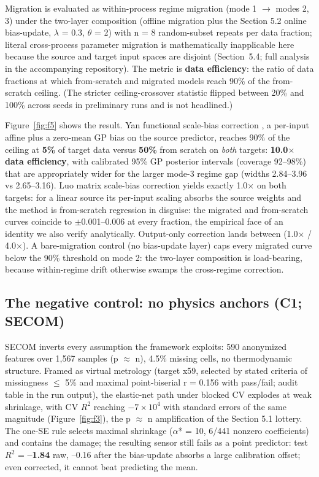 Migration is evaluated as within-process regime migration (mode 1 $\to$ modes 2, 3) under
the two-layer composition (offline migration plus the Section 5.2 online bias-update,
$\lambda$ = 0.3, $\theta$ = 2) with n = 8 random-subset repeats per data fraction; literal
cross-process parameter migration is mathematically inapplicable here because the
source and target input spaces are disjoint (Section~5.4; full analysis in the accompanying repository). The metric is \textbf{data
efficiency}: the ratio of data fractions at which from-scratch and migrated models
reach 90\% of the from-scratch ceiling. (The stricter ceiling-crossover statistic
flipped between 20\% and 100\% across seeds in preliminary runs and is not headlined.)

Figure~\ref{fig:f5} shows the result. Yan functional scale-bias correction \citep{yan2011}, a per-input affine plus a
zero-mean GP bias on the source predictor, reaches 90\% of the ceiling at \textbf{5\%} of
target data versus \textbf{50\%} from scratch on \emph{both} targets: \textbf{10.0$\times$ data efficiency},
with calibrated 95\% GP posterior intervals (coverage 92--98\%) that are appropriately
wider for the larger mode-3 regime gap (widths 2.84--3.96 vs 2.65--3.16). Luo matrix
scale-bias correction \citep{luo2015} yields exactly 1.0$\times$ on both targets: for a linear
source its per-input scaling absorbs the source weights and the method is from-scratch
regression in disguise: the migrated and from-scratch curves coincide to $\pm$0.001--0.006
at every fraction, the empirical face of an identity we also verify analytically.
Output-only correction \citep{lu2008similarity} lands between (1.0$\times$ / 4.0$\times$). A bare-migration control
(no bias-update layer) caps every migrated curve below the 90\% threshold on mode 2:
the two-layer composition is load-bearing, because within-regime drift otherwise
swamps the cross-regime correction.

\subsection{The negative control: no physics anchors (C1; SECOM)}

SECOM inverts every assumption the framework exploits: 590 anonymized features over
1,567 samples (p $\approx$ n), 4.5\% missing cells, no thermodynamic structure. Framed as
virtual metrology (target x59, selected by stated criteria of missingness $\le$ 5\% and maximal
\textbar point-biserial r\textbar{} = 0.156 with pass/fail; audit table in the run output), the
elastic-net path under blocked CV explodes at weak shrinkage, with CV $R^2$ reaching $-7 \times 10^4$
with standard errors of the same magnitude (Figure~\ref{fig:f3}), the p $\approx$ n amplification of the
Section 5.1 lottery. The one-SE rule selects maximal shrinkage ($\alpha$* = 10, 6/441 nonzero
coefficients) and contains the damage; the resulting sensor still fails as a point
predictor: test $R^2$ = \textbf{--1.84} raw, --0.16 after the bias-update absorbs a large
calibration offset; even corrected, it cannot beat predicting the mean.

